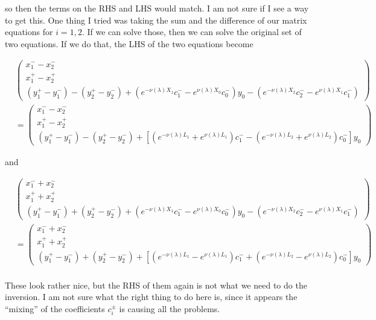 \documentclass[12pt]{article}
\begin{document}
\begin{enumerate}
so then the terms on the RHS and LHS would match. I am not sure if I see a way to get this. One thing I tried was taking the sum and the difference of our matrix equations for $i = 1, 2$. If we can solve those, then we can solve the original set of two equations. If we do that, the LHS of the two equations become

\begin{align*}
&\begin{pmatrix}x_1^- - x_2^- \\ x_1^+ - x_2^+ \\ (y_1^+ - y_1^-) - (y_2^+ - y_2^-) + (e^{-\nu(\lambda)X_1} c_1^- - e^{\nu(\lambda)X_{0}} c_{0}^-) y_0 - (e^{-\nu(\lambda)X_2} c_2^- - e^{\nu(\lambda)X_{1}} c_{1}^-)\end{pmatrix} \\
&= \begin{pmatrix}x_1^- - x_2^- \\ x_1^+ - x_2^+ \\ (y_1^+ - y_1^-) - (y_2^+ - y_2^-) + [(e^{-\nu(\lambda)L_1} + e^{\nu(\lambda)L_1}) c_1^- - (e^{-\nu(\lambda)L_2} + e^{\nu(\lambda)L_2})c_0^-]y_0 \end{pmatrix} 
\end{align*}

and 

\begin{align*}
&\begin{pmatrix}x_1^- + x_2^- \\ x_1^+ + x_2^+ \\ (y_1^+ - y_1^-) + (y_2^+ - y_2^-) + (e^{-\nu(\lambda)X_1} c_1^- - e^{\nu(\lambda)X_{0}} c_{0}^-) y_0 - (e^{-\nu(\lambda)X_2} c_2^- - e^{\nu(\lambda)X_{1}} c_{1}^-)\end{pmatrix} \\
&= \begin{pmatrix}x_1^- + x_2^- \\ x_1^+ + x_2^+ \\ (y_1^+ - y_1^-) + (y_2^+ - y_2^-) + [(e^{-\nu(\lambda)L_1} - e^{\nu(\lambda)L_1}) c_1^- + (e^{-\nu(\lambda)L_2} - e^{\nu(\lambda)L_2})c_0^-]y_0 \end{pmatrix} \\
\end{align*}

These look rather nice, but the RHS of them again is not what we need to do the inversion. I am not sure what the right thing to do here is, since it appears the ``mixing'' of the coefficients $c_i^\pm$ is causing all the problems.


\end{enumerate}
\end{document}
